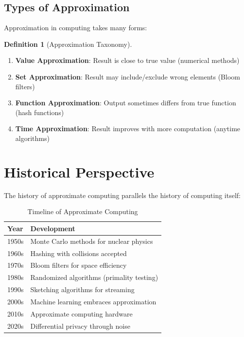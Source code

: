 \documentclass[11pt,twoside,openright]{book}
\theoremstyle{definition}
\newtheorem{definition}{Definition}[chapter]
\theoremstyle{plain}
\theoremstyle{remark}
\begin{document}
\subsection{Types of Approximation}

Approximation in computing takes many forms:

\begin{definition}[Approximation Taxonomy]
\begin{enumerate}
    \item \textbf{Value Approximation}: Result is close to true value (numerical methods)
    \item \textbf{Set Approximation}: Result may include/exclude wrong elements (Bloom filters)
    \item \textbf{Function Approximation}: Output sometimes differs from true function (hash functions)
    \item \textbf{Time Approximation}: Result improves with more computation (anytime algorithms)
\end{enumerate}
\end{definition}

\section{Historical Perspective}

The history of approximate computing parallels the history of computing itself:

\begin{table}[h]
\centering
\begin{tabular}{ll}
\toprule
Year & Development \\
\midrule
1950s & Monte Carlo methods for nuclear physics \\
1960s & Hashing with collisions accepted \\
1970s & Bloom filters for space efficiency \\
1980s & Randomized algorithms (primality testing) \\
1990s & Sketching algorithms for streaming \\
2000s & Machine learning embraces approximation \\
2010s & Approximate computing hardware \\
2020s & Differential privacy through noise \\
\bottomrule
\end{tabular}
\caption{Timeline of Approximate Computing}
\end{table}
\end{document}
